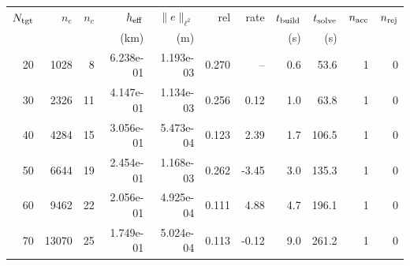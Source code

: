 \begin{tabular}{rrrrrrrrrrr}
\hline
$N_{\rm tgt}$ & $n_e$ & $n_c$ & $h_{\rm eff}$ & $\|e\|_{\ell^2}$ & rel & rate & $t_{\rm build}$ & $t_{\rm solve}$ & $n_{\rm acc}$ & $n_{\rm rej}$ \\
 & & & (km) & (m) & & & (s) & (s) & & \\
\hline
20 & 1028 & 8 & 6.238e-01 & 1.193e-03 & 0.270 & -- & 0.6 & 53.6 & 1 & 0 \\
30 & 2326 & 11 & 4.147e-01 & 1.134e-03 & 0.256 & 0.12 & 1.0 & 63.8 & 1 & 0 \\
40 & 4284 & 15 & 3.056e-01 & 5.473e-04 & 0.123 & 2.39 & 1.7 & 106.5 & 1 & 0 \\
50 & 6644 & 19 & 2.454e-01 & 1.168e-03 & 0.262 & -3.45 & 3.0 & 135.3 & 1 & 0 \\
60 & 9462 & 22 & 2.056e-01 & 4.925e-04 & 0.111 & 4.88 & 4.7 & 196.1 & 1 & 0 \\
70 & 13070 & 25 & 1.749e-01 & 5.024e-04 & 0.113 & -0.12 & 9.0 & 261.2 & 1 & 0 \\
\hline
\end{tabular}
